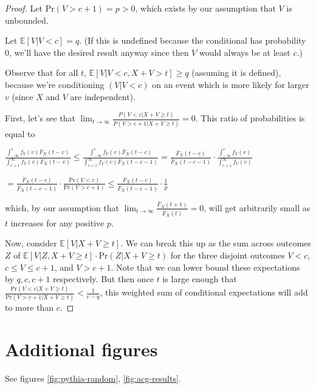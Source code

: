 \documentclass{article}
\begin{document}
\begin{proof}
Let \(\text{Pr}(V>c+1)=p>0\), which exists by our assumption that \(V\) is unbounded.

Let \(\mathbb E[V|V<c] = q\). (If this is undefined because the conditional has probability \(0\), we'll have the desired result anyway since then \(V\) would always be at least \(c\).) 

Observe that for all \(t\), \(\mathbb E[V|V<c, X+V>t] \ge q\) (assuming it is defined), because we're conditioning \((V|V<c)\) on an event which is more likely for larger \(v\) (since \(X\) and \(V\) are independent). 

First, let's see that \(\lim_{t\to\infty}\frac{P(V<c|X+V\ge t)}{P(V>c+1|X+V\ge t)}=0\). This ratio of probabilities is equal to

\(\frac{\int_{-\infty}^c f_V(v)\bar F_X(t-v)}{\int_{c+1}^\infty f_V(v)\bar F_X(t-v)} \le \frac{\int_{-\infty}^c f_V(v)\bar F_X(t-c)}{\int_{c+1}^\infty f_V(v)\bar F_X(t-c-1)} = \frac{\bar F_X(t-c)}{\bar F_X(t-c-1)}\cdot \frac{\int_{-\infty}^c f_V(v)}{\int_{c+1}^\infty f_V(v)}\)

\(=\frac{\bar F_X(t-c)}{\bar F_X(t-c-1)}\cdot \frac{\text{Pr}(V<c)}{\text{Pr}(V>c+1)}\le \frac{\bar F_X(t-c)}{\bar F_X(t-c-1)}\cdot \frac1p\)

which, by our assumption that \(\lim_{t\to\infty}\frac{\bar{F}_X(t+1)}{\bar{F}_X(t)}=0\), will get arbitrarily small as \(t\) increases for any positive \(p\).

Now, consider \(\mathbb E[V|X+V\ge t]\). We can break this up as the sum across outcomes \(Z\) of \(\mathbb E[V|Z,X+V\ge t]\cdot \text{Pr}(Z | X+V\ge t)\) for the three disjoint outcomes \(V<c\), \(c\le V\le c+1\), and \(V>c+1\). Note that we can lower bound these expectations by \(q, c, c+1\) respectively. But then once \(t\) is large enough that \(\frac{\text{Pr}(V<c|X+V\ge t)}{\text{Pr}(V>c+1|X+V\ge t)}<\frac1{c-q}\),  this weighted sum of conditional expectations will add to more than \(c\).
\end{proof}

\section{Additional figures}

See figures \ref{fig:pythia-random}, \ref{fig:acg-results}.
\end{document}
